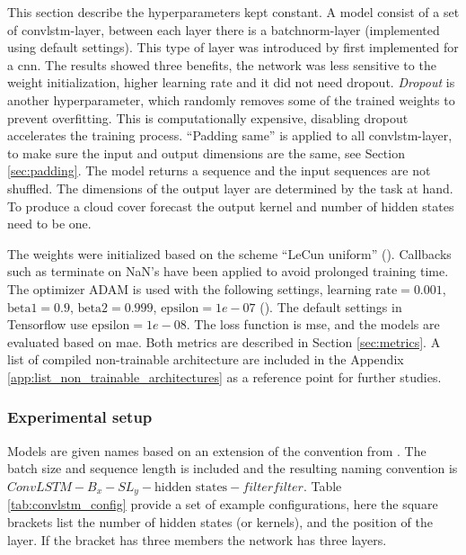 This section describe the hyperparameters kept constant. A model consist of a set of \acrshort{convlstm}-layer, between each layer there is a \acrfull{batchnorm}-layer (implemented using default settings). 
This type of layer was introduced by  first implemented for a \acrshort{cnn}. The results showed three benefits, the network was less sensitive to the weight initialization, higher learning rate and it did not need dropout. \textit{Dropout} is another hyperparameter, which randomly removes some of the trained weights to prevent overfitting. This is computationally expensive, disabling dropout accelerates the training process. ``Padding same'' is applied to all \acrshort{convlstm}-layer, to make sure the input and output dimensions are the same, see Section \ref{sec:padding}. The model returns a sequence and the input sequences are not shuffled. 
The dimensions of the output layer are determined by the task at hand. To produce a cloud cover forecast the output kernel and number of hidden states need to be one. %

The weights were initialized based on the scheme ``LeCun uniform''  (\cite{Lecun98efficientbackprop}). Callbacks such as %
terminate on NaN's have been applied to avoid prolonged training time. The optimizer ADAM is used with the following settings, $\text{learning rate}=0.001$, $\text{beta1}=0.9$, $\text{beta2}=0.999$, $\text{epsilon}=1e-07$ (\cite{Kingma2015Adam:Optimization}). The default settings in Tensorflow use $\text{epsilon}=1e-08$. The loss function is \acrfull{mse}, and the models are evaluated based on \acrfull{mae}. Both metrics are described in Section \ref{sec:metrics}. 
A list of compiled non-trainable architecture are included in the Appendix \ref{app:list_non_trainable_architectures} as a reference point for further studies.

\subsubsection{Experimental setup}
Models are given names based on an extension of the convention from .
The batch size and sequence length is included and 
the resulting naming convention is  $ConvLSTM-B_{x}-SL_{y}-\text{hidden states}-filter$\times$filter$. Table \ref{tab:convlstm_config} provide a set of example configurations, here the square brackets list the number of hidden states (or kernels), and the position of the layer. If the bracket has three members the network has three layers. %


